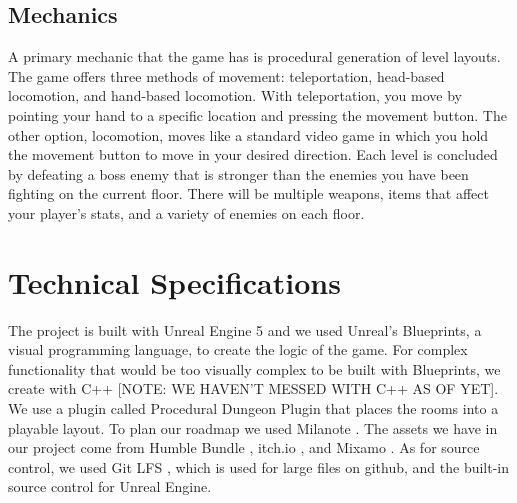 \documentclass{sigchi}
\begin{document}
\subsection*{Mechanics}
A primary mechanic that the game has is procedural generation of level layouts. The game offers three methods of movement: teleportation, head-based locomotion, and hand-based locomotion. With teleportation, you move by pointing your hand to a specific location and pressing the movement button. The other option, locomotion, moves like a standard video game in which you hold the movement button to move in your desired direction. Each level is concluded by defeating a boss enemy that is stronger than the enemies you have been fighting on the current floor. There will be multiple weapons, items that affect your player's stats, and a variety of enemies on each floor.

\section{Technical Specifications}
The project is built with Unreal Engine 5 \cite{unrealweb} and we used Unreal's Blueprints, a visual programming language, to create the logic of the game. For complex functionality that would be too visually complex to be built with Blueprints, we create with C++ [NOTE: WE HAVEN'T MESSED WITH C++ AS OF YET]. We use a plugin called Procedural Dungeon Plugin \cite{dungeonplugin} that places the rooms into a playable layout. To plan our roadmap we used Milanote \cite{milanote}. The assets we have in our project come from Humble Bundle \cite{humble}, itch.io \cite{itch}, and Mixamo \cite{mixamo}. As for source control, we used Git LFS \cite{gitlfs}, which is used for large files on github, and the built-in source control for Unreal Engine.
\end{document}
